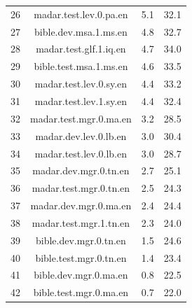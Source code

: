 \begin{table}[htbp]
\begin{tabular}{l@{\hspace{3pt}}c@{\hspace{3pt}}c@{\hspace{3pt}}c}
26 & madar.test.lev.0.pa.en & 5.1 & 32.1 \\
27 & bible.dev.msa.1.ms.en & 4.8 & 32.7 \\
28 & madar.test.glf.1.iq.en & 4.7 & 34.0 \\
29 & bible.test.msa.1.ms.en & 4.6 & 33.5 \\
30 & madar.test.lev.0.sy.en & 4.4 & 33.2 \\
31 & madar.test.lev.1.sy.en & 4.4 & 32.4 \\
32 & madar.test.mgr.0.ma.en & 3.2 & 28.5 \\
33 & madar.dev.lev.0.lb.en & 3.0 & 30.4 \\
34 & madar.test.lev.0.lb.en & 3.0 & 28.7 \\
35 & madar.dev.mgr.0.tn.en & 2.7 & 25.1 \\
36 & madar.test.mgr.0.tn.en & 2.5 & 24.3 \\
37 & madar.dev.mgr.0.ma.en & 2.4 & 24.4 \\
38 & madar.test.mgr.1.tn.en & 2.3 & 24.0 \\
39 & bible.dev.mgr.0.tn.en & 1.5 & 24.6 \\
40 & bible.test.mgr.0.tn.en & 1.4 & 23.4 \\
41 & bible.dev.mgr.0.ma.en & 0.8 & 22.5 \\
42 & bible.test.mgr.0.ma.en & 0.7 & 22.0 \\
\bottomrule
\end{tabular}
\end{table}